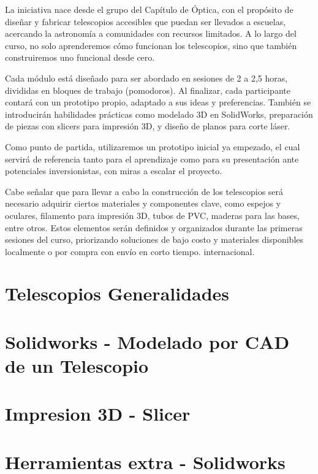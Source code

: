 \documentclass[12pt, twoside]{book}
\begin{document}
	La iniciativa nace desde el grupo del Capítulo de Óptica, con el propósito de diseñar y fabricar telescopios accesibles que puedan ser llevados a escuelas, acercando la astronomía a comunidades con recursos limitados. A lo largo del curso, no solo aprenderemos cómo funcionan los telescopios, sino que también construiremos uno funcional desde cero.
	
	Cada módulo está diseñado para ser abordado en sesiones de 2 a 2,5 horas, divididas en bloques de trabajo (pomodoros). Al finalizar, cada participante contará con un prototipo propio, adaptado a sus ideas y preferencias. También se introducirán habilidades prácticas como modelado 3D en SolidWorks, preparación de piezas con slicers para impresión 3D, y diseño de planos para corte láser.
	
	Como punto de partida, utilizaremos un prototipo inicial ya empezado, el cual servirá de referencia tanto para el aprendizaje como para su presentación ante potenciales inversionistas, con miras a escalar el proyecto.
	
	Cabe señalar que para llevar a cabo la construcción de los telescopios será necesario adquirir ciertos materiales y componentes clave, como espejos y oculares, filamento para impresión 3D, tubos de PVC, maderas para las bases, entre otros. Estos elementos serán definidos y organizados durante las primeras sesiones del curso, priorizando soluciones de bajo costo y materiales disponibles localmente o por compra con envío en corto tiempo. internacional. 
	
	
	\chapter{Telescopios Generalidades}
	\label{telescopes_general}
	
	
	\chapter{Solidworks - Modelado por CAD de un Telescopio}
	\label{solidworks_focused_telescopes}
	
	
	\chapter{Impresion 3D - Slicer}
	
	\chapter{Herramientas extra - Solidworks}
	\label{advanced_techniques}
	
	
\end{document}
